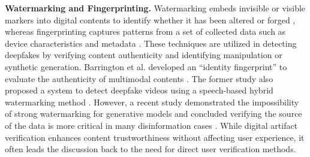 \textbf{Watermarking and Fingerprinting.}
Watermarking embeds invisible or visible markers into digital contents to identify whether it has been altered or forged \cite{van1994digital,mohanty1999digital,podilchuk2001digital}, whereas fingerprinting captures patterns %
from a set of collected data such as device characteristics and metadata \cite{qureshi2019blockchain}. These techniques are utilized in detecting deepfakes by verifying content authenticity and identifying %
manipulation or synthetic generation. Barrington et al. developed an “identity fingerprint”
to evaluate the authenticity of multimodal contents \cite{barrington2023single}. The former study also proposed a system to detect deepfake videos using a speech-based hybrid watermarking method \cite{qureshi2021detecting}. However, a recent study demonstrated the impossibility of strong watermarking for generative models %
and concluded verifying the source of the data is more critical %
in many disinformation cases \cite{zhang2023watermarks}. While digital artifact verification enhances content trustworthiness without affecting user experience, it often leads the discussion back to the need for direct user verification methods. 
\vspace{-2mm}
